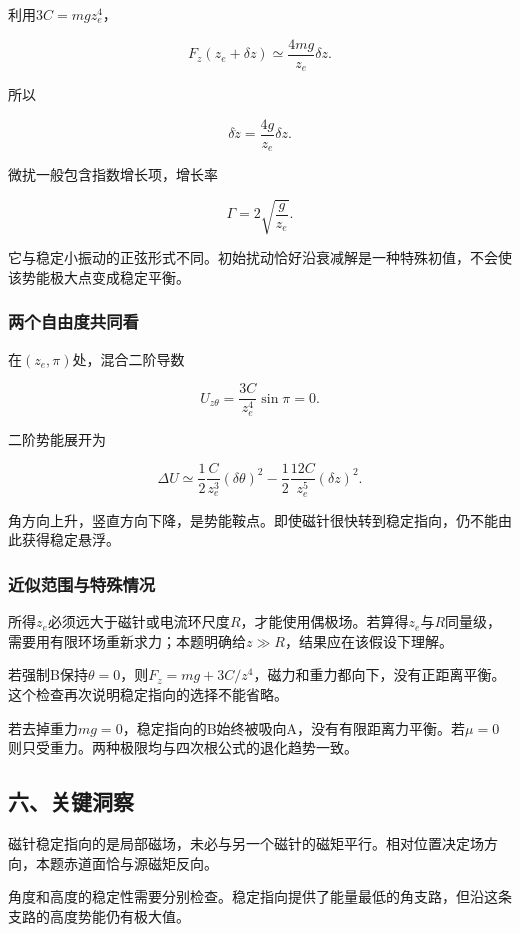 \documentclass[12pt,a4paper,fontset=fandol]{ctexart}
\begin{document}
利用\(3C=mgz_e^4\)，

\[
F_z(z_e+\delta z)\simeq\frac{4mg}{z_e}\delta z.
\]

所以

\[
\delta\ddot z=\frac{4g}{z_e}\delta z.
\]

微扰一般包含指数增长项，增长率

\[
\Gamma=2\sqrt{\frac g{z_e}}.
\]

它与稳定小振动的正弦形式不同。初始扰动恰好沿衰减解是一种特殊初值，不会使该势能极大点变成稳定平衡。

\subsubsection{两个自由度共同看}\label{ux4e24ux4e2aux81eaux7531ux5ea6ux5171ux540cux770b}

在\((z_e,\pi)\)处，混合二阶导数

\[
U_{z\theta}=\frac{3C}{z_e^4}\sin\pi=0.
\]

二阶势能展开为

\[
\Delta U\simeq
\frac12\frac C{z_e^3}(\delta\theta)^2
-\frac12\frac{12C}{z_e^5}(\delta z)^2.
\]

角方向上升，竖直方向下降，是势能鞍点。即使磁针很快转到稳定指向，仍不能由此获得稳定悬浮。

\subsubsection{近似范围与特殊情况}\label{ux8fd1ux4f3cux8303ux56f4ux4e0eux7279ux6b8aux60c5ux51b5}

所得\(z_e\)必须远大于磁针或电流环尺度\(R\)，才能使用偶极场。若算得\(z_e\)与\(R\)同量级，需要用有限环场重新求力；本题明确给\(z\gg R\)，结果应在该假设下理解。

若强制B保持\(\theta=0\)，则\(F_z=mg+3C/z^4\)，磁力和重力都向下，没有正距离平衡。这个检查再次说明稳定指向的选择不能省略。

若去掉重力\(m g=0\)，稳定指向的B始终被吸向A，没有有限距离力平衡。若\(\mu=0\)则只受重力。两种极限均与四次根公式的退化趋势一致。

\subsection{六、关键洞察}\label{ux516dux5173ux952eux6d1eux5bdf-3}

磁针稳定指向的是局部磁场，未必与另一个磁针的磁矩平行。相对位置决定场方向，本题赤道面恰与源磁矩反向。

角度和高度的稳定性需要分别检查。稳定指向提供了能量最低的角支路，但沿这条支路的高度势能仍有极大值。
\end{document}
